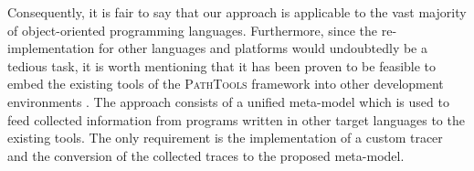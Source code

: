 Consequently, it is fair to say that our approach is applicable to the vast majority of object-oriented programming languages.
Furthermore, since the re-implementation for other languages and platforms would undoubtedly be a tedious task, it is worth mentioning that it has been proven to be feasible to embed the existing tools of the \textsc{PathTools} framework into other development environments \cite{richter_awesome_2013}.
The approach consists of a unified meta-model which is used to feed collected information from programs written in other target languages to the existing tools.
The only requirement is the implementation of a custom tracer and the conversion of the collected traces to the proposed meta-model.